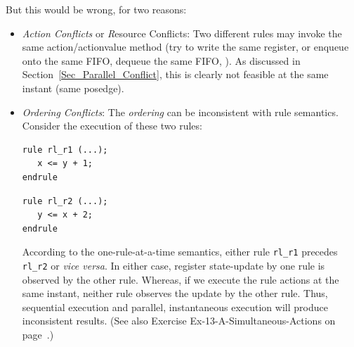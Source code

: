 But this would be wrong, for two reasons:

\begin{itemize}

 \item \emph{Action Conflicts} or {\emph Resource Conflicts}: Two
       different rules may invoke the same action/actionvalue method
       (try to write the same register, or enqueue onto the same FIFO,
       dequeue the same FIFO, {\etc}).  As discussed in
       Section~\ref{Sec_Parallel_Conflict}, this is clearly not
       feasible at the same instant (same posedge).

 \item \emph{Ordering Conflicts}: The \emph{ordering} can be
       inconsistent with rule semantics.  Consider the execution of
       these two rules:

       \begin{center}
       \begin{minipage}{2.5in}
        {\footnotesize
        \begin{Verbatim}[frame=single, label=BSV]
rule rl_r1 (...);
   x <= y + 1;
endrule
        \end{Verbatim}
        }
       \end{minipage}
       \hmm
       \begin{minipage}{2.5in}
        {\footnotesize
        \begin{Verbatim}[frame=single,label=BSV]
rule rl_r2 (...);
   y <= x + 2;
endrule
        \end{Verbatim}
        }
       \end{minipage}
       \end{center}

       According to the one-rule-at-a-time semantics, either rule
       \verb|rl_r1| precedes \verb|rl_r2| or \emph{vice versa}.  In
       either case, register state-update by one rule is observed by
       the other rule.  Whereas, if we execute the rule actions at the
       same instant, neither rule observes the update by the other
       rule.  Thus, sequential execution and parallel, instantaneous
       execution will produce inconsistent results. (See also Exercise
       Ex-13-A-Simultaneous-Actions on
       page~\pageref{Ex-13-A-Simultaneous-Actions}.)

\end{itemize}

